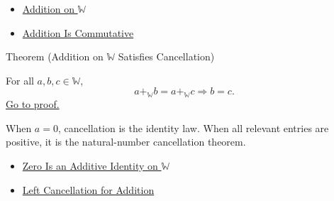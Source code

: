 \begin{dependencies}
\begin{itemize}
  \item \hyperref[def:addition-on-w]{Addition on $\mathbb{W}$}
  \item \hyperref[thm:addition-commutative]{Addition Is Commutative}
\end{itemize}
\end{dependencies}

\begin{theorembox}{Theorem (Addition on \texorpdfstring{$\mathbb{W}$}{W} Satisfies Cancellation)}
\begin{theorem}
\label{thm:addition-on-w-cancellation}
For all $a,b,c\in\mathbb{W}$,
\[
a+_{\mathbb{W}}b=a+_{\mathbb{W}}c\Longrightarrow b=c.
\]
\hyperref[prf:addition-on-w-cancellation]{Go to proof.}
\end{theorem}
\end{theorembox}

\begin{remark*}[Interpretation]
When $a=0$, cancellation is the identity law. When all relevant entries are
positive, it is the natural-number cancellation theorem.
\end{remark*}

\begin{dependencies}
\begin{itemize}
  \item \hyperref[thm:zero-additive-identity-on-w]{Zero Is an Additive Identity on $\mathbb{W}$}
  \item \hyperref[thm:addition-left-cancellation]{Left Cancellation for Addition}
\end{itemize}
\end{dependencies}

